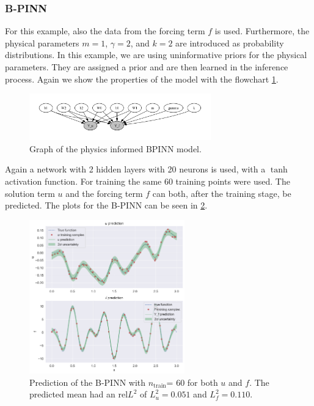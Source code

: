 \documentclass{article}
\newcommand{\nt}{$n_\text{train}$}
\begin{document}
\subsubsection{B-PINN}
For this example, also the data from the forcing term $f$ is used. Furthermore, the physical parameters \( m = 1 \), \( \gamma = 2 \), and \( k = 2 \) are introduced as probability distributions. In this example, we are using uninformative priors for the physical parameters. They are assigned a prior and are then learned in the inference process. Again we show the properties of the model with the flowchart \ref{fig:modelrender}.
\begin{figure}[htbp!]
    \centering
    \includegraphics[width=0.7\textwidth]{plots/BPINN/bnn_oscilator1_pinn.pdf}
    \caption{Graph of the physics informed BPINN model.}
    \label{fig:modelrender}
\end{figure}
Again a network with 2 hidden layers with 20 neurons is used, with a $\tanh$ activation function. For training the same 60 training points were used. The solution term $u$ and the forcing term $f$ can both, after the training stage, be predicted. The plots for the B-PINN can be seen in \ref{fig:BPINNpred}.
\begin{figure}[htbp!]
    \centering
    \includegraphics[width=0.6\textwidth]{plots/BPINN/oscilator1_60_[20, 20, 1].png}
    \caption{Prediction of the B-PINN with \nt = 60 for both $u$ and $f$. The predicted mean had an rel$L^2$ of $L^2_u=0.051$ and $L^2_f=0.110$.}
    \label{fig:BPINNpred}
\end{figure}
\end{document}
